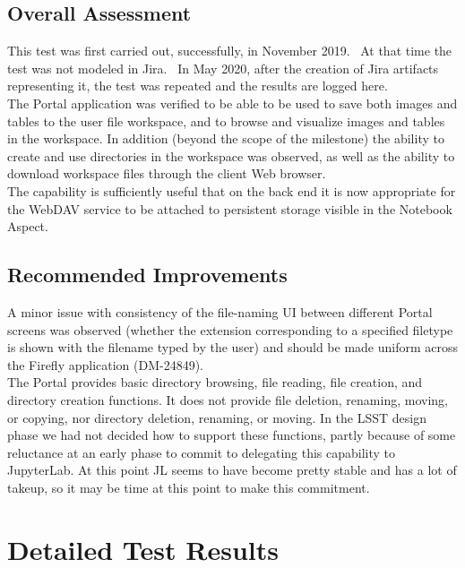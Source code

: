 \documentclass[DM,lsstdraft,STR,toc]{lsstdoc}
\begin{document}
\subsection{Overall Assessment}
\label{sect:overallassessment}

This test was first carried out, successfully, in November 2019. ~At
that time the test was not modeled in Jira. ~In May 2020, after the
creation of Jira artifacts representing it, the test was repeated and
the results are logged here.\\[2\baselineskip]The Portal application was
verified to be able to be used to save both images and tables to the
user file workspace, and to browse and visualize images and tables in
the workspace. In addition (beyond the scope of the milestone) the
ability to create and use directories in the workspace was observed, as
well as the ability to download workspace files through the client Web
browser.\\[2\baselineskip]The capability is sufficiently useful that on
the back end it is now appropriate for the WebDAV service to be attached
to persistent storage visible in the Notebook Aspect.

\subsection{Recommended Improvements}
\label{sect:recommendations}

A minor issue with consistency of the file-naming UI between different
Portal screens was observed (whether the extension corresponding to a
specified filetype is shown with the filename typed by the user) and
should be made uniform across the Firefly application
(DM-24849).\\[2\baselineskip]The Portal provides basic directory
browsing, file reading, file creation, and directory creation functions.
It does not provide file deletion, renaming, moving, or copying, nor
directory deletion, renaming, or moving. In the LSST design phase we had
not decided how to support these functions, partly because of some
reluctance at an early phase to commit to delegating this capability to
JupyterLab. At this point JL seems to have become pretty stable and has
a lot of takeup, so it may be time at this point to make this
commitment.

\newpage
\section{Detailed Test Results}
\label{sect:detailedtestresults}
\end{document}
